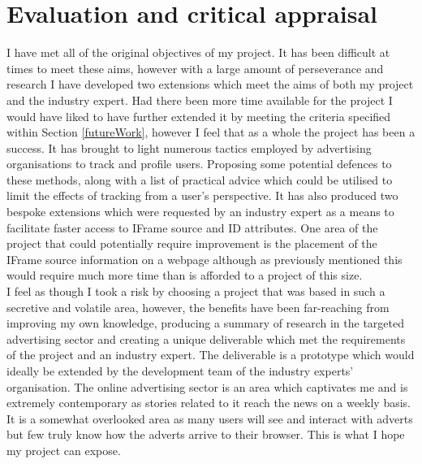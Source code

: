 \documentclass[12pt]{article}
\begin{document}
\section{Evaluation and critical appraisal} \label{eval}
I have met all of the original objectives of my project. It has been difficult at times to meet these aims, however with a large amount of perseverance and research I have developed two extensions which meet the aims of both my project and the industry expert. Had there been more time available for the project I would have liked to have further extended it by meeting the criteria specified within Section \ref{futureWork}, however I feel that as a whole the project has been a success. It has brought to light numerous tactics employed by advertising organisations to track and profile users. Proposing some potential defences to these methods, along with a list of practical advice which could be utilised to limit the effects of tracking from a user's perspective. It has also produced two bespoke extensions which were requested by an industry expert as a means to facilitate faster access to IFrame source and ID attributes. One area of the project that could potentially require improvement is the placement of the IFrame source information on a webpage although as previously mentioned this would require much more time than is afforded to a project of this size. \\

I feel as though I took a risk by choosing a project that was based in such a secretive and volatile area, however, the benefits have been far-reaching from improving my own knowledge, producing a summary of research in the targeted advertising sector and creating a unique deliverable which met the requirements of the project and an industry expert. The deliverable is a prototype which would ideally be extended by the development team of the industry experts' organisation. The online advertising sector is an area which captivates me and is extremely contemporary as stories related to it reach the news on a weekly basis. It is a somewhat overlooked area as many users will see and interact with adverts but few truly know how the adverts arrive to their browser. This is what I hope my project can expose. \\
\end{document}
